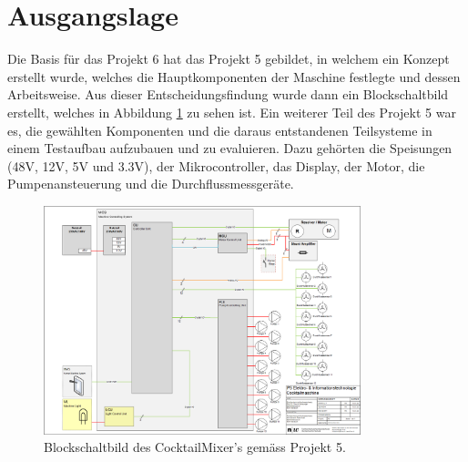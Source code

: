\section{Ausgangslage}
\label{sec:Ausgangslage}

Die Basis für das Projekt 6 hat das Projekt 5 gebildet, in welchem ein Konzept erstellt wurde, welches die Hauptkomponenten der Maschine festlegte und dessen Arbeitsweise. Aus dieser Entscheidungsfindung wurde dann ein Blockschaltbild erstellt, welches in Abbildung \ref{fig:P5_Blockschaltbild_Cocktailmixer} zu sehen ist. Ein weiterer Teil des Projekt 5 war es, die gewählten Komponenten und die daraus entstandenen Teilsysteme in einem Testaufbau aufzubauen und zu evaluieren. Dazu gehörten die Speisungen (48V, 12V, 5V und 3.3V), der Mikrocontroller, das Display, der Motor, die Pumpenansteuerung und die Durchflussmessgeräte.

\begin{figure}[H]
\center
\includegraphics[angle=90, width = 0.82\textwidth]{graphics/P5-Blockschema}
\caption{Blockschaltbild des CocktailMixer's gemäss Projekt 5.}
\label{fig:P5_Blockschaltbild_Cocktailmixer}
\end{figure}

\newpage

